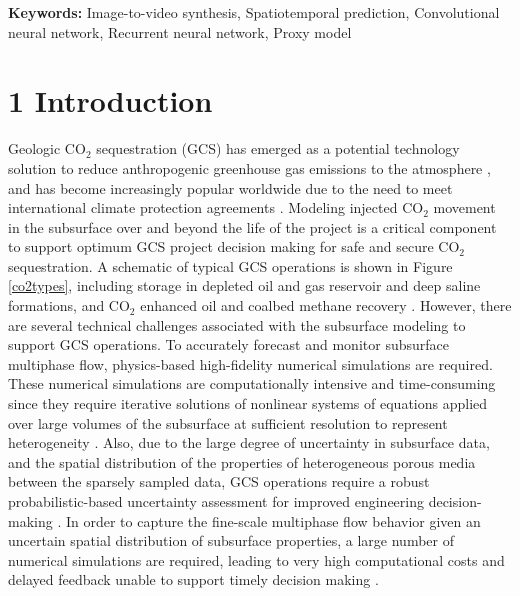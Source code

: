 \documentclass[10pt, twoside]{article}
\begin{document}
\textbf{Keywords:} Image-to-video synthesis, Spatiotemporal prediction, Convolutional neural network, Recurrent neural network, Proxy model

\section*{\textbf{1 Introduction}}
Geologic CO$_2$ sequestration (GCS) has emerged as a potential technology solution to reduce anthropogenic greenhouse gas emissions to the atmosphere \cite{Michael2010, Goodman2013329, Levine201681}, and has become increasingly popular worldwide due to the need to meet international climate protection agreements \cite{metz2005ipcc, Energy20202010EuropeanCommission, Unitednations2015AgreementP}. Modeling injected CO$_2$ movement in the subsurface over and beyond the life of the project is a critical component to support optimum GCS project decision making for safe and secure CO$_2$ sequestration. A schematic of typical GCS operations is shown in Figure \ref{co2types}, including storage in depleted oil and gas reservoir and deep saline formations, and CO$_2$ enhanced oil and coalbed methane recovery \cite{Bachu2015188, Tapia2016337, Castelletto2013570}. However, there are several technical challenges associated with the subsurface modeling to support GCS operations. To accurately forecast and monitor subsurface multiphase flow, physics-based high-fidelity numerical simulations are required. These numerical simulations are computationally intensive and time-consuming since they require iterative solutions of nonlinear systems of equations applied over large volumes of the subsurface at sufficient resolution to represent heterogeneity \cite{rustamzade2023, Rashid201321, Luo2011759, 2021AGUFM.H25O1207S}. Also, due to the large degree of uncertainty in subsurface data, and the spatial distribution of the properties of heterogeneous porous media between the sparsely sampled data, GCS operations require a robust probabilistic-based uncertainty assessment for improved engineering decision-making \cite{Chen2018, Sun2019, Chen2020}. In order to capture the fine-scale multiphase flow behavior given an uncertain spatial distribution of subsurface properties, a large number of numerical simulations are required, leading to very high computational costs and delayed feedback unable to support timely decision making \cite{Li2015389, Jiang2023}. 
\end{document}
